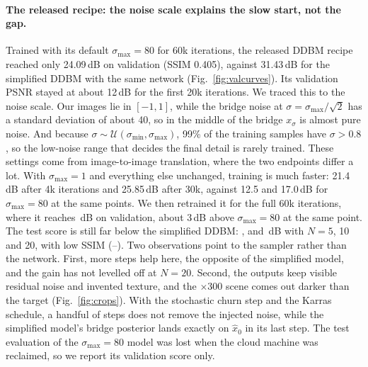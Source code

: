 \paragraph{The released recipe: the noise scale explains the slow start, not the gap.} Trained with its default $\sigma_{\max}=80$ for 60k iterations, the released DDBM recipe reached only 24.09\,dB on validation (SSIM 0.405), against 31.43\,dB for the simplified DDBM with the same network (Fig.~\ref{fig:valcurves}). Its validation PSNR stayed at about 12\,dB for the first 20k iterations. We traced this to the noise scale. Our images lie in $[-1,1]$, while the bridge noise at $\sigma=\sigma_{\max}/\sqrt2$ has a standard deviation of about 40, so in the middle of the bridge $x_\sigma$ is almost pure noise. And because $\sigma\sim\mathcal U(\sigma_{\min},\sigma_{\max})$, 99\% of the training samples have $\sigma>0.8$, so the low-noise range that decides the final detail is rarely trained. These settings come from image-to-image translation, where the two endpoints differ a lot. With $\sigma_{\max}=1$ and everything else unchanged, training is much faster: 21.4\,dB after 4k iterations and 25.85\,dB after 30k, against 12.5 and 17.0\,dB for $\sigma_{\max}=80$ at the same points. We then retrained it for the full 60k iterations, where it reaches \SONEVAL\,dB on validation, about 3\,dB above $\sigma_{\max}=80$ at the same point. The test score is still far below the simplified DDBM: \SONEFIVEPSNR, \SONETENPSNR{} and \SONETWENTYPSNR\,dB with $N=5$, 10 and 20, with low SSIM (\SONEFIVESSIM--\SONETWENTYSSIM). Two observations point to the sampler rather than the network. First, more steps help here, the opposite of the simplified model, and the gain has not levelled off at $N=20$. Second, the outputs keep visible residual noise and invented texture, and the $\times300$ scene comes out darker than the target (Fig.~\ref{fig:crops}). With the stochastic churn step and the Karras schedule, a handful of steps does not remove the injected noise, while the simplified model's bridge posterior lands exactly on $\hat x_0$ in its last step. The test evaluation of the $\sigma_{\max}=80$ model was lost when the cloud machine was reclaimed, so we report its validation score only.

